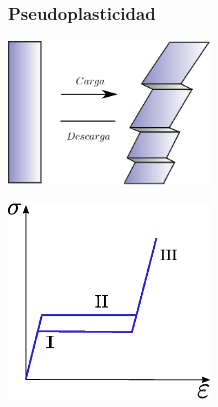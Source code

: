 \documentclass[usenames,dvipsnames]{beamer}
\begin{document}
% 
% 


\begin{frame}

\frametitle{Pseudoplasticidad}

\begin{multicols}{2}
\includegraphics[width=0.4\textwidth]{img/intro/HisteresisEsquema.eps}

\includegraphics[width=0.4\textwidth]{img/intro/Histeresis.eps}
\end{multicols}

\end{frame}

\end{document}
